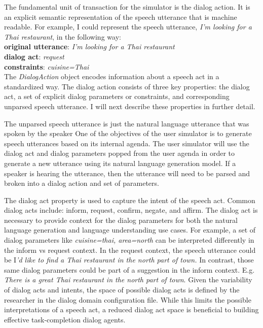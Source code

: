The fundamental unit of transaction for the simulator is the dialog action. It is an explicit semantic representation of the speech utterance that is machine readable. For example, I could represent the speech utterance, \textit{I'm looking for a Thai restaurant}, in the following way: \\
\textbf{original utterance}: \textit{I'm looking for a Thai restaurant}   \\
\textbf{dialog act}: \textit{request}\\ 
\textbf{constraints}: \textit{cuisine=Thai}\\

The \textit{DialogAction} object encodes information about a speech act in a standardized way. The dialog action consists of three key properties: the dialog act, a set of explicit dialog parameters or constraints, and corresponding unparsed speech utterance. I will next describe these properties in further detail. 

The unparsed speech utterance is just the natural language utterance that was spoken by the speaker One of the objectives of the user simulator is to generate speech utterances based on its internal agenda. The user simulator will use the dialog act and dialog parameters popped from the user agenda in order to generate a new utterance using its natural language generation model. If a speaker is hearing the utterance, then the utterance will need to be parsed and broken into a dialog action and set of parameters. 

The dialog act property is used to capture the intent of the speech act. Common dialog acts include: inform, request, confirm, negate, and affirm. The dialog act is necessary to provide context for the dialog parameters for both the natural language generation and language understanding use cases. For example, a set of dialog parameters like \textit{{cuisine=thai, area=north}} can be interpreted differently in the inform vs request context. In the request context, the speech utterance could be I\textit{'d like to find a Thai restaurant in the north part of town.} In contrast, those same dialog parameters could be part of a suggestion in the inform context. E.g. \textit{There is a great Thai restaurant in the north part of town}. Given the variability of dialog acts and intents, the space of possible dialog acts is defined by the researcher in the dialog domain configuration file. While this limits the possible interpretations of a speech act, a reduced dialog act space is beneficial to building effective task-completion dialog agents.  

